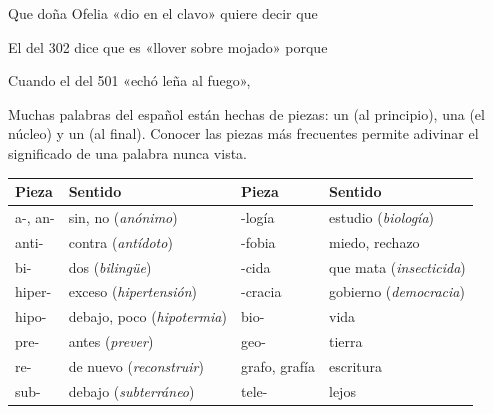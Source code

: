 \taller
{}
\begin{ejercicios}
\item Que doña Ofelia «dio en el clavo» quiere decir que
\item El del 302 dice que es «llover sobre mojado» porque
\item Cuando el del 501 «echó leña al fuego»,
\end{ejercicios}

\bitacora


Muchas palabras del español están hechas de piezas: un  (al principio), una  (el núcleo) y un
 (al final). Conocer las piezas más frecuentes permite adivinar el significado de una palabra nunca vista.

\begin{center}\small
\begin{tabular}{@{}ll@{\qquad}ll@{}}
\toprule
\textbf{Pieza} & \textbf{Sentido} & \textbf{Pieza} & \textbf{Sentido}\\\midrule
a-, an- & sin, no (\emph{anónimo}) & -logía & estudio (\emph{biología})\\
anti- & contra (\emph{antídoto}) & -fobia & miedo, rechazo\\
bi- & dos (\emph{bilingüe}) & -cida & que mata (\emph{insecticida})\\
hiper- & exceso (\emph{hipertensión}) & -cracia & gobierno (\emph{democracia})\\
hipo- & debajo, poco (\emph{hipotermia}) & bio- & vida\\
pre- & antes (\emph{prever}) & geo- & tierra\\
re- & de nuevo (\emph{reconstruir}) & grafo, grafía & escritura\\
sub- & debajo (\emph{subterráneo}) & tele- & lejos\\\bottomrule
\end{tabular}
\end{center}

